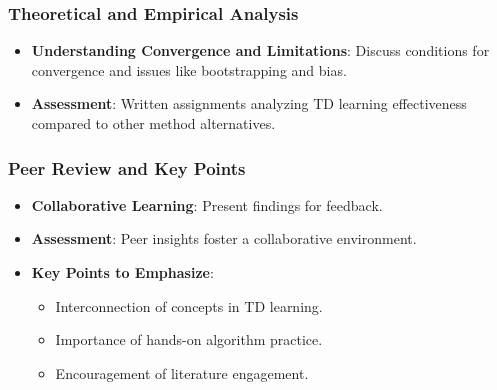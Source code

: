 \documentclass[aspectratio=169]{beamer}
\begin{document}
\begin{frame}[fragile]
    \frametitle{Theoretical and Empirical Analysis}
    \begin{itemize}
        \item \textbf{Understanding Convergence and Limitations}: Discuss conditions for convergence and issues like bootstrapping and bias.
        \item \textbf{Assessment}: Written assignments analyzing TD learning effectiveness compared to other method alternatives.
    \end{itemize}
\end{frame}

\begin{frame}[fragile]
    \frametitle{Peer Review and Key Points}
    \begin{itemize}
        \item \textbf{Collaborative Learning}: Present findings for feedback.
        \item \textbf{Assessment}: Peer insights foster a collaborative environment.
    
        \item \textbf{Key Points to Emphasize}:
        \begin{itemize}
            \item Interconnection of concepts in TD learning.
            \item Importance of hands-on algorithm practice.
            \item Encouragement of literature engagement.
        \end{itemize}
    \end{itemize}
\end{frame}
\end{document}
